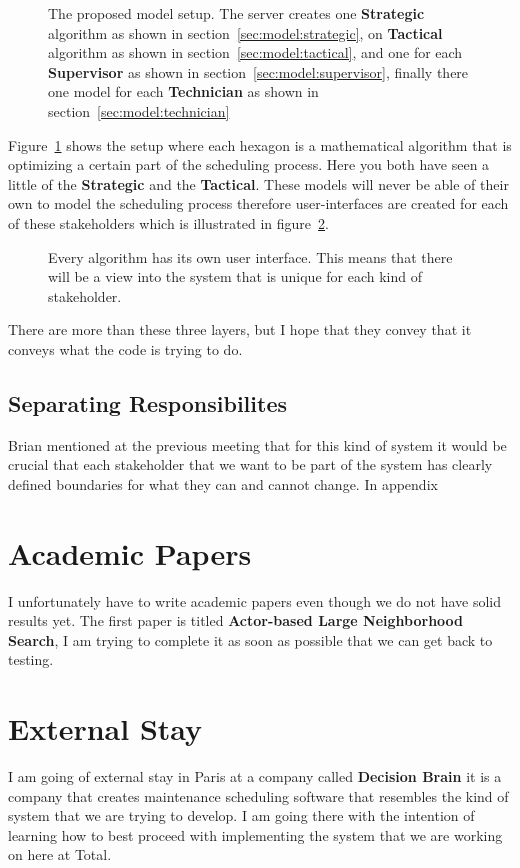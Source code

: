 \begin{figure}[H]
	\centering
    \drawModelSetupHexagon[userinterface=false, persistence=false, metaheuristics=true]
	\caption{The proposed model setup. The server creates one \textbf{Strategic} algorithm as shown in section~\ref{sec:model:strategic}, 
	on \textbf{Tactical} algorithm as shown in section~\ref{sec:model:tactical}, and 
	one for each \textbf{Supervisor} as shown in section~\ref{sec:model:supervisor}, 
	finally there one model for each \textbf{Technician} as shown in section~\ref{sec:model:technician}}
	\label{fig:hexagon:metaheuristics}
\end{figure}
Figure~\ref{fig:hexagon:metaheuristics} 
shows the setup where each hexagon is a mathematical algorithm that is optimizing
a certain part of the scheduling process. Here you both have seen a little of the \textbf{Strategic}
and the \textbf{Tactical}. These models will never be able of their own to model the scheduling process therefore user-interfaces are 
created for each of these stakeholders which is illustrated in figure~\ref{fig:hexagon:userinterfaces}.

\begin{figure}[H]
	\centering
    \drawModelSetupHexagon[userinterface=true, persistence=false, metaheuristics=false]
	\caption{Every algorithm has its own user interface. This means that there will be a view into the system that is 
	unique for each kind of stakeholder.}
	\label{fig:hexagon:userinterfaces}
\end{figure}

There are more than these three layers, but I hope that they convey that it conveys what the code is trying to do.

\subsection{Separating Responsibilites}
Brian mentioned at the previous meeting that for this kind of system it would be crucial that
each stakeholder that we want to be part of the system has clearly defined boundaries for what
they can and cannot change. In appendix \

\section{Academic Papers}
I unfortunately have to write academic papers even though we do not have solid results yet.
The first paper
is titled \textbf{Actor-based Large Neighborhood Search}, I am trying to complete it as 
soon as possible that we can get back to testing.

\section{External Stay}
I am going of external stay in Paris at a company called \textbf{Decision Brain} it is a 
company that creates maintenance scheduling software that resembles the kind of system 
that we are trying to develop. I am going there with the intention of learning how to
best proceed with implementing the system that we are working on here at Total.
